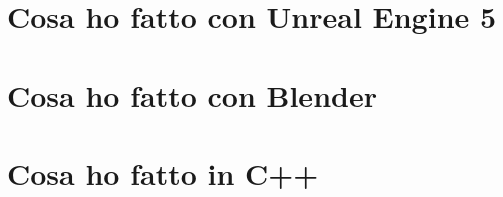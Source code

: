 \section{Cosa ho fatto con Unreal Engine 5}\label{se:prima-sezione}

\section{Cosa ho fatto con Blender}

\section{Cosa ho fatto in C++}